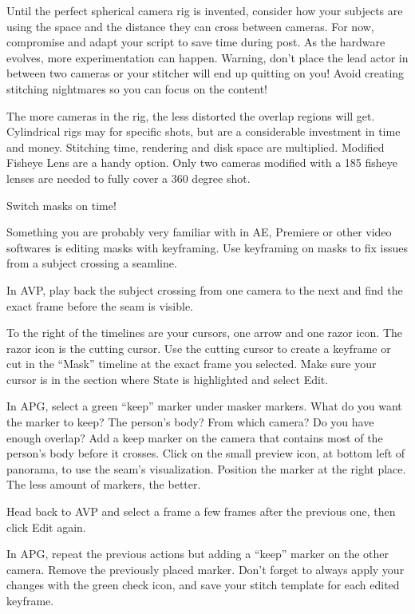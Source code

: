 \begin{fullwidth}
Until the perfect spherical camera rig is invented, consider how your subjects are using the space and the distance they can cross between cameras. For now, compromise and adapt your script to save time during post. As the hardware evolves, more experimentation can happen. Warning, don’t place the lead actor in between two cameras or your stitcher will end up quitting on you! Avoid creating stitching nightmares so you can focus on the content!

The more cameras in the rig, the less distorted the overlap regions will get. Cylindrical rigs may for specific shots, but are a considerable investment in time and money. Stitching time, rendering and disk space are multiplied. Modified Fisheye Lens are a handy option. Only two cameras modified with a 185 fisheye lenses are needed to fully cover a 360 degree shot.

{\large Switch masks on time! \par}

Something you are probably very familiar with in AE, Premiere or other video softwares is editing masks with keyframing. Use keyframing on masks to fix issues from a subject crossing a seamline. 

In AVP, play back the subject crossing from one camera to the next and find the exact frame before the seam is visible. 

To the right of the timelines are your cursors, one arrow and one razor icon. The razor icon is the cutting cursor. Use the cutting cursor to create a keyframe or cut in the “Mask” timeline at the exact frame you selected. Make sure your cursor is in the section where State is highlighted and select Edit.


In APG, select a green “keep” marker under masker markers. What do you want the marker to keep? The person’s body? From which camera? Do you have enough overlap? Add a keep marker on the camera that contains most of the person’s body before it crosses. Click on the small preview icon, at bottom left of panorama, to use the seam’s visualization. Position the marker at the right place. The less amount of markers, the better.


Head back to AVP and select a frame a few frames after the previous one, then click Edit again. 


In APG, repeat the previous actions but adding a “keep” marker on the other camera. Remove the previously placed marker. Don’t forget to always apply your changes with the green check icon, and save your stitch template for each edited keyframe.


\end{fullwidth}
